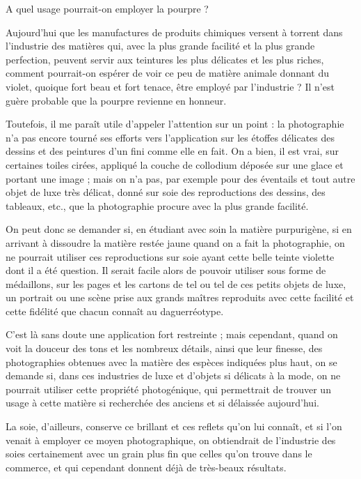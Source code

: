\documentclass[a4paper, 11pt, oneside, polutonikogreek, french]{article}
\begin{document}
A quel usage pourrait-on employer la pourpre ?

Aujourd'hui que les manufactures de produits chimiques versent à torrent dans l'industrie des matières qui, avec la plus grande facilité et la plus grande perfection, peuvent servir aux teintures les plus délicates et les plus riches, comment pourrait-on espérer de voir ce peu de matière animale donnant du violet, quoique fort beau et fort tenace, être employé par l'industrie ? Il n'est guère probable que la pourpre revienne en honneur.

Toutefois, il me paraît utile d'appeler l'attention sur un point : la photographie n'a pas encore tourné ses efforts vers l'application sur les étoffes délicates des dessins et des peintures d'un fini comme elle en fait. On a bien, il est vrai, sur certaines toiles cirées, appliqué la couche de collodium déposée sur une glace et portant une image ; mais on n'a pas, par exemple pour des éventails et tout autre objet de luxe très délicat, donné sur soie des reproductions des dessins, des tableaux, etc., que la photographie procure avec la plus grande facilité.

On peut donc se demander si, en étudiant avec soin la matière purpurigène, si en arrivant à dissoudre la matière restée jaune quand on a fait la photographie, on ne pourrait utiliser ces reproductions sur soie ayant cette belle teinte violette dont il a été question. Il serait facile alors de pouvoir utiliser sous forme de médaillons, sur les pages et les cartons de tel ou tel de ces petits objets de luxe, un portrait ou une scène prise aux grands maîtres reproduits avec cette facilité et cette fidélité que chacun connaît au daguerréotype.

C'est là sans doute une application fort restreinte ; mais cependant, quand on voit la douceur des tons et les nombreux détails, ainsi que leur finesse, des photographies obtenues avec la matière des espèces indiquées plus haut, on se demande si, dans ces industries de luxe et d'objets si délicats à la mode, on ne pourrait utiliser cette propriété photogénique, qui permettrait de trouver un usage à cette matière si recherchée des anciens et si délaissée aujourd'hui.

La soie, d'ailleurs, conserve ce brillant et ces reflets qu'on lui connaît, et si l'on venait à employer ce moyen photographique, on obtiendrait de l'industrie des soies certainement avec un grain plus fin que celles qu'on trouve dans le commerce, et qui cependant donnent déjà de très-beaux résultats.
\end{document}
